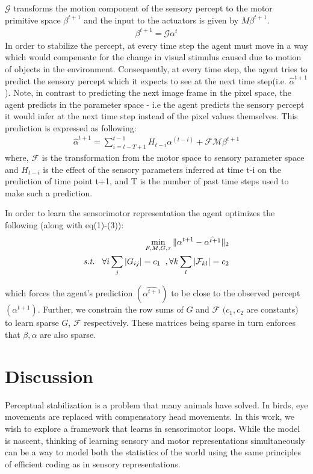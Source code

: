 \documentclass[conference]{IEEEtran}
\begin{document}
$\mathcal{G}$ transforms the motion component of the sensory percept to the motor primitive space $\beta^{t+1}$ and the input to the actuators is given by $M\beta^{t+1}$.
\begin{eqnarray}
\beta^{t+1} = \mathcal{G} \alpha^{t}
\end{eqnarray}
In order to stabilize the percept, at every time step the agent must move in a way which would compensate for the change in visual stimulus caused due to motion of objects in the environment. Consequently, at every time step, the agent tries to predict the sensory percept which it expects to see at the next time step(i.e. $\hat{\alpha}^{t+1}$). Note, in contrast to predicting the next image frame in the pixel space, the agent predicts in the parameter space - i.e the agent predicts the sensory percept it would infer at the next time step instead of the pixel values themselves. This prediction is expressed as following:
\begin{eqnarray}
\hat{\alpha}^{t+1} = \sum_{i=t-T+1}^{t-1}  H_{t-i} \alpha^{(t-i)} + \mathcal{F}\mathcal{M}\beta^{t+1} 
\end{eqnarray}
where, $\mathcal{F}$ is the transformation from the motor space to sensory parameter space and $H_{t-i}$ is the effect of the sensory parameters inferred at time t-i on the prediction of time point t+1, and T is the number of past time steps used to make such a prediction. 

In order to learn the sensorimotor representation the agent optimizes the following (along with eq(1)-(3)):
\begin{eqnarray}
\min_{F,M,G,\tau} \| \alpha^{t+1} - \hat{\alpha^{t+1}} \|_{2} \\
\nonumber \textit{s.t.} \hspace{3mm} \forall i \sum_{j}  |G_{ij}| = c_1  \hspace{2mm}, \forall k \sum_{l}  |\mathcal{F}_{kl}| = c_2 
\end{eqnarray}

which forces the agent's prediction $(\hat{\alpha^{t+1}})$ to be close to the observed percept$({\alpha^{t+1}})$. Further, we constrain the row sums of $G$ and $\mathcal{F}$ $(c_1, c_2 $ are constants) to learn sparse $G$, $\mathcal{F}$ respectively. These matrices being sparse in turn enforces that $\beta,\hat{\alpha} $ are also sparse.

\section{Discussion}
Perceptual stabilization is a problem that many animals have solved. In birds, eye movements are replaced with compensatory head movements. In this work, we wish to explore a framework that learns in sensorimotor loops. While the model is nascent, thinking of learning sensory and motor representations simultaneously can be a way to model both the statistics of the world using the same principles of efficient coding as in sensory representations.
\end{document}
